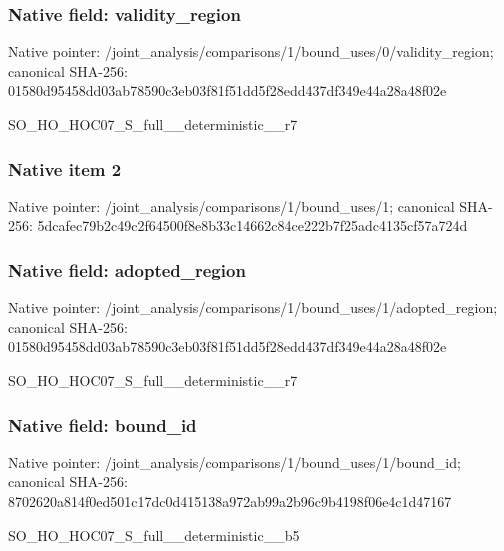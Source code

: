 \documentclass[10pt,a4paper]{article}
\begin{document}
\subsubsection{Native field: validity\_\allowbreak{}region}
Native pointer: /joint\_\allowbreak{}analysis/comparisons/1/bound\_\allowbreak{}uses/0/validity\_\allowbreak{}region; canonical SHA-256: 01580d95458dd03ab78590c3eb03f81f51dd5f28edd437df349e44a28a48f02e

\begingroup\raggedright\sloppy SO\_\allowbreak{}HO\_\allowbreak{}HOC07\_\allowbreak{}S\_\allowbreak{}full\_\allowbreak{}\_\allowbreak{}deterministic\_\allowbreak{}\_\allowbreak{}r7\par\endgroup

\subsubsection{Native item 2}
Native pointer: /joint\_\allowbreak{}analysis/comparisons/1/bound\_\allowbreak{}uses/1; canonical SHA-256: 5dcafec79b2c49c2f64500f8e8b33c14662c84ce222b7f25adc4135cf57a724d

\subsubsection{Native field: adopted\_\allowbreak{}region}
Native pointer: /joint\_\allowbreak{}analysis/comparisons/1/bound\_\allowbreak{}uses/1/adopted\_\allowbreak{}region; canonical SHA-256: 01580d95458dd03ab78590c3eb03f81f51dd5f28edd437df349e44a28a48f02e

\begingroup\raggedright\sloppy SO\_\allowbreak{}HO\_\allowbreak{}HOC07\_\allowbreak{}S\_\allowbreak{}full\_\allowbreak{}\_\allowbreak{}deterministic\_\allowbreak{}\_\allowbreak{}r7\par\endgroup

\subsubsection{Native field: bound\_\allowbreak{}id}
Native pointer: /joint\_\allowbreak{}analysis/comparisons/1/bound\_\allowbreak{}uses/1/bound\_\allowbreak{}id; canonical SHA-256: 8702620a814f0ed501c17dc0d415138a972ab99a2b96c9b4198f06e4c1d47167

\begingroup\raggedright\sloppy SO\_\allowbreak{}HO\_\allowbreak{}HOC07\_\allowbreak{}S\_\allowbreak{}full\_\allowbreak{}\_\allowbreak{}deterministic\_\allowbreak{}\_\allowbreak{}b5\par\endgroup
\end{document}
